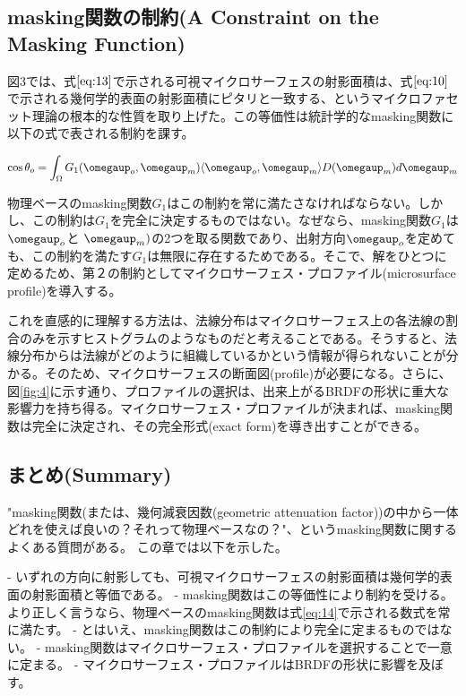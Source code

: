 \documentclass[a4paper,xelatex,ja=standard]{bxjsarticle}
\begin{document}
\subsection{masking関数の制約(A Constraint on the Masking Function)}

図3では、式$\eqref{eq:13}$で示される可視マイクロサーフェスの射影面積は、式$\eqref{eq:10}$で示される幾何学的表面の射影面積にピタリと一致する、というマイクロファセット理論の根本的な性質を取り上げた。この等価性は統計学的なmasking関数に以下の式で表される制約を課す。

\begin{equation}
    \cos \theta_o = \int_\Omega G_1(\boldsymbol{\omegaup}_o, \boldsymbol{\omegaup}_m) \langle \boldsymbol{\omegaup}_o, \boldsymbol{\omegaup}_m \rangle D(\boldsymbol{\omegaup}_m) d\boldsymbol{\omegaup}_m
    \label{eq:14}
\end{equation}

物理ベースのmasking関数$G_1$はこの制約を常に満たさなければならない。しかし、この制約は$G_1$を完全に決定するものではない。なぜなら、masking関数$G_1$は$\boldsymbol{\omegaup}_o$と $\boldsymbol{\omegaup}_m)$の2つを取る関数であり、出射方向$\boldsymbol{\omegaup}_o$を定めても、この制約を満たす$G_1$は無限に存在するためである。そこで、解をひとつに定めるため、第２の制約としてマイクロサーフェス・プロファイル(microsurface profile)を導入する。

これを直感的に理解する方法は、法線分布はマイクロサーフェス上の各法線の割合のみを示すヒストグラムのようなものだと考えることである。そうすると、法線分布からは法線がどのように組織しているかという情報が得られないことが分かる。そのため、マイクロサーフェスの断面図(profile)が必要になる。さらに、図\ref{fig:4}に示す通り、プロファイルの選択は、出来上がるBRDFの形状に重大な影響力を持ち得る。マイクロサーフェス・プロファイルが決まれば、masking関数は完全に決定され、その完全形式(exact form)を導き出すことができる。

\subsection{まとめ(Summary)}

"masking関数(または、幾何減衰因数(geometric attenuation factor))の中から一体どれを使えば良いの？それって物理ベースなの？"、というmasking関数に関するよくある質問がある。
この章では以下を示した。

- いずれの方向に射影しても、可視マイクロサーフェスの射影面積は幾何学的表面の射影面積と等価である。
- masking関数はこの等価性により制約を受ける。より正しく言うなら、物理ベースのmasking関数は式\eqref{eq:14}で示される数式を常に満たす。
- とはいえ、masking関数はこの制約により完全に定まるものではない。
- masking関数はマイクロサーフェス・プロファイルを選択することで一意に定まる。
- マイクロサーフェス・プロファイルはBRDFの形状に影響を及ぼす。
\end{document}
